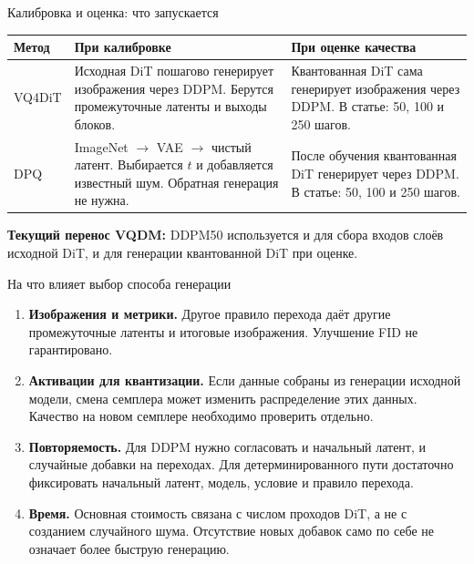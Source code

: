 \documentclass[aspectratio=169,10pt]{beamer}
\newcommand{\takeaway}[1]{\par\vspace{1.5mm}{\bfseries #1\par}}
\newcommand{\tights}{\setlength{\itemsep}{1.4mm}\setlength{\parsep}{0pt}\setlength{\parskip}{0pt}}
\newenvironment{datatable}{\par\begingroup\fontsize{10}{12}\selectfont\setlength{\tabcolsep}{4pt}\renewcommand{\arraystretch}{1.25}}{\par\endgroup}
\begin{document}
\begin{frame}[t]{Калибровка и оценка: что запускается}
  \begin{datatable}
    \begin{tabularx}{\textwidth}{@{}L{20mm}>{\raggedright\arraybackslash}X>{\raggedright\arraybackslash}X@{}}
      \toprule
      Метод & При калибровке & При оценке качества \\
      \midrule
      VQ4DiT & Исходная DiT пошагово генерирует изображения через DDPM.
      Берутся промежуточные латенты и выходы блоков. & Квантованная DiT сама генерирует изображения
      через DDPM. В статье: 50, 100 и 250 шагов. \\
      \addlinespace
      DPQ & ImageNet $\to$ VAE $\to$ чистый латент. Выбирается $t$ и добавляется
      известный шум. Обратная генерация не нужна. & После обучения квантованная DiT
      генерирует через DDPM. В статье: 50, 100 и 250 шагов. \\
      \bottomrule
    \end{tabularx}
  \end{datatable}
  \textbf{Текущий перенос VQDM:} DDPM50 используется и для сбора входов слоёв
  исходной DiT, и для генерации квантованной DiT при оценке.
  \takeaway{В DPQ случайное зашумление примера не является SDE-семплингом:\par
  вход сразу строится для одного $t$, без цепочки обратных переходов.}
\end{frame}

\begin{frame}[t]{На что влияет выбор способа генерации}
  \begin{enumerate}\tights
    \item \textbf{Изображения и метрики.} Другое правило перехода даёт другие
    промежуточные латенты и итоговые изображения. Улучшение FID не гарантировано.
    \item \textbf{Активации для квантизации.} Если данные собраны из генерации
    исходной модели, смена семплера может изменить распределение этих данных.
    Качество на новом семплере необходимо проверить отдельно.
    \item \textbf{Повторяемость.} Для DDPM нужно согласовать и начальный латент,
    и случайные добавки на переходах. Для детерминированного пути достаточно
    фиксировать начальный латент, модель, условие и правило перехода.
    \item \textbf{Время.} Основная стоимость связана с числом проходов DiT,
    а не с созданием случайного шума. Отсутствие новых добавок само по себе
    не означает более быструю генерацию.
  \end{enumerate}
  \takeaway{Выбор семплера не меняет веса или кодбуки.\par
  Это отдельная настройка генерации, а не переход от калибровки к оценке.}
\end{frame}
\end{document}
